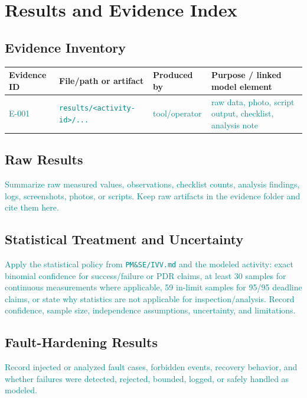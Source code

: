 \documentclass{../common/latex/delta_base_styles/delta_base_styles}
\newcommand{\placeholder}[1]{\textcolor{DarkCyan}{#1}}
\begin{document}
\section{Results and Evidence Index}
\subsection{Evidence Inventory}
\begin{tabular}{|>{\centering\arraybackslash}m{2.4cm}
                |>{\centering\arraybackslash}m{4.0cm}
                |>{\centering\arraybackslash}m{3.0cm}
                |>{\centering\arraybackslash}m{5.0cm}|}
\hline
\textbf{Evidence ID} & \textbf{File/path or artifact} & \textbf{Produced by} & \textbf{Purpose / linked model element} \\
\hline
\placeholder{E-001} & \placeholder{\texttt{results/<activity-id>/...}} & \placeholder{tool/operator} & \placeholder{raw data, photo, script output, checklist, analysis note} \\
\hline
\end{tabular}

\subsection{Raw Results}
\placeholder{Summarize raw measured values, observations, checklist counts, analysis findings, logs, screenshots, photos, or scripts. Keep raw artifacts in the evidence folder and cite them here.}

\subsection{Statistical Treatment and Uncertainty}
\placeholder{Apply the statistical policy from \texttt{PM\&SE/IVV.md} and the modeled activity: exact binomial confidence for success/failure or PDR claims, at least 30 samples for continuous measurements where applicable, 59 in-limit samples for 95/95 deadline claims, or state why statistics are not applicable for inspection/analysis. Record confidence, sample size, independence assumptions, uncertainty, and limitations.}

\subsection{Fault-Hardening Results}
\placeholder{Record injected or analyzed fault cases, forbidden events, recovery behavior, and whether failures were detected, rejected, bounded, logged, or safely handled as modeled.}
\end{document}
